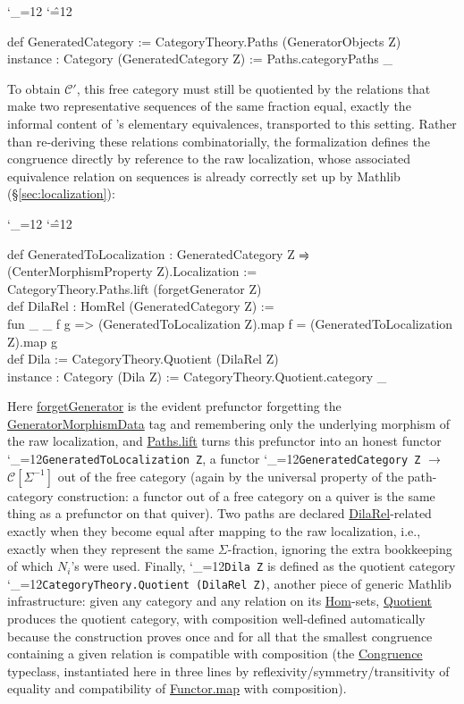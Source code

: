 \documentclass[11pt]{amsart}
\newcommand{\lc}[1]{\url{#1}}
\newcommand{\lcode}{\begingroup\catcode`\_=12\relax\lcodeInner}
\newcommand{\lcodeInner}[1]{\texttt{#1}\endgroup}
\newenvironment{leancode}{%
  \begingroup
  \catcode`\_=12\relax
  \catcode`\^=12\relax
  \small\ttfamily\raggedright\baselineskip=1.15\baselineskip
  \par\smallskip\noindent
}{%
  \par\smallskip
  \endgroup
}
\theoremstyle{plain}
\theoremstyle{definition}
\theoremstyle{remark}
\newcommand{\calC}{\mathcal C}
\begin{document}
\begin{leancode}
def GeneratedCategory := CategoryTheory.Paths (GeneratorObjects Z) \\
instance : Category (GeneratedCategory Z) := Paths.categoryPaths _ \\
\end{leancode}

To obtain $\calC'$, this free category must still be quotiented by the relations that make
two representative sequences of the same fraction equal, exactly the informal content of
\citep[Definition~2.4]{Mayeux}'s elementary equivalences, transported to this setting. Rather than
re-deriving these relations combinatorially, the formalization defines the congruence
directly by reference to the raw localization, whose associated equivalence relation on
sequences is already correctly set up by Mathlib (\S\ref{sec:localization}):

\begin{leancode}
def GeneratedToLocalization : GeneratedCategory Z ⥤ (CenterMorphismProperty Z).Localization := \\
  CategoryTheory.Paths.lift (forgetGenerator Z) \\[0.5\baselineskip]
def DilaRel : HomRel (GeneratedCategory Z) := \\
  fun {_ _} f g => (GeneratedToLocalization Z).map f = (GeneratedToLocalization Z).map g \\[0.5\baselineskip]
def Dila := CategoryTheory.Quotient (DilaRel Z) \\
instance : Category (Dila Z) := CategoryTheory.Quotient.category _ \\
\end{leancode}
Here \lc{forgetGenerator} is the evident prefunctor forgetting the \lc{GeneratorMorphismData}
tag and remembering only the underlying morphism of the raw localization, and
\lc{Paths.lift} turns this prefunctor into an honest functor
\lcode{GeneratedToLocalization Z}, a functor \lcode{GeneratedCategory Z} $\to$ $\calC[\Sigma^{-1}]$ out of the
free category (again by the universal property of the path-category construction: a functor
out of a free category on a quiver is the same thing as a prefunctor on that quiver). Two
paths are declared \lc{DilaRel}-related exactly when they become equal after mapping to the
raw localization, i.e., exactly when they represent the same $\Sigma$-fraction, ignoring
the extra bookkeeping of which $N_i$'s were used. Finally, \lcode{Dila Z} is defined as the
quotient category \lcode{CategoryTheory.Quotient (DilaRel Z)}, another piece of generic Mathlib
infrastructure: given any category and any relation on its \lc{Hom}-sets, \lc{Quotient}
produces the quotient category, with composition well-defined automatically because the
construction proves once and for all that the smallest congruence containing a given relation is
compatible with composition (the \lc{Congruence} typeclass, instantiated here in three lines
by reflexivity/symmetry/transitivity of equality and compatibility of \lc{Functor.map} with
composition).
\end{document}
